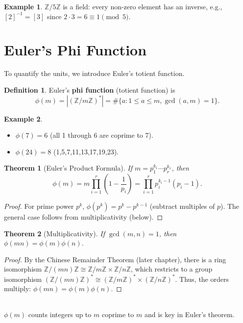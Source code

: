 \documentclass[12pt,openany]{book}
\theoremstyle{definition}
\newtheorem{definition}{Definition}[chapter]
\newtheorem{example}{Example}[chapter]
\theoremstyle{plain}
\newtheorem{theorem}{Theorem}[chapter]
\theoremstyle{remark}
\begin{document}
\begin{example}
  $\mathbb{Z}/5\mathbb{Z}$ is a field: every non-zero element has an inverse, e.g., $[2]^{-1} = [3]$ since $2 \cdot 3 = 6 \equiv 1 \pmod{5}$.
\end{example}

\section{Euler’s Phi Function}

To quantify the units, we introduce Euler's totient function.

\begin{definition}
  Euler's \textbf{phi function} (totient function) is
  \[
  \phi(m) = |(\mathbb{Z}/m\mathbb{Z})^*| = \#\{ a : 1 \leq a \leq m, \gcd(a, m) = 1 \}.
  \]
\end{definition}

\begin{example}
  \begin{itemize}
    \item $\phi(7) = 6$ (all 1 through 6 are coprime to 7).
    \item $\phi(24) = 8$ (1,5,7,11,13,17,19,23).
  \end{itemize}
\end{example}

\begin{theorem}[Euler's Product Formula]
  If $m = p_1^{k_1} \cdots p_r^{k_r}$, then
  \[
  \phi(m) = m \prod_{i=1}^r \left(1 - \frac{1}{p_i}\right) = \prod_{i=1}^r p_i^{k_i - 1} (p_i - 1).
  \]
\end{theorem}

\begin{proof}
  For prime power $p^k$, $\phi(p^k) = p^k - p^{k-1}$ (subtract multiples of $p$). The general case follows from multiplicativity (below).
\end{proof}

\begin{theorem}[Multiplicativity]
  If $\gcd(m, n) = 1$, then $\phi(m n) = \phi(m) \phi(n)$.
\end{theorem}

\begin{proof}
  By the Chinese Remainder Theorem (later chapter), there is a ring isomorphism $\mathbb{Z}/(m n)\mathbb{Z} \cong \mathbb{Z}/m\mathbb{Z} \times \mathbb{Z}/n\mathbb{Z}$, which restricts to a group isomorphism $(\mathbb{Z}/(m n)\mathbb{Z})^* \cong (\mathbb{Z}/m\mathbb{Z})^* \times (\mathbb{Z}/n\mathbb{Z})^*$. Thus, the orders multiply: $\phi(m n) = \phi(m) \phi(n)$.
\end{proof}
\noindent
\\
$\phi(m)$ counts integers up to $m$ coprime to $m$ and is key in Euler's theorem.
\end{document}
